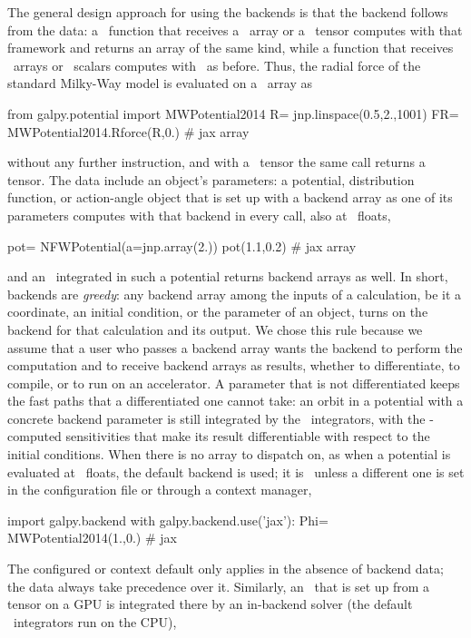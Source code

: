 The general design approach for using the backends is that the backend follows from the data: 
a \galpy\ function that receives a \jax\
array or a \torch\ tensor computes with that framework and returns an
array of the same kind, while a function that receives \numpy\ arrays or
\python\ scalars computes with \numpy\ as before. Thus, the radial force
of the standard Milky-Way model is evaluated on a \jax\ array as
\begin{code}
from galpy.potential import MWPotential2014
R= jnp.linspace(0.5,2.,1001)
FR= MWPotential2014.Rforce(R,0.) # jax array
\end{code}
without any further instruction, and with a \torch\ tensor the same
call returns a tensor. The data include an object's parameters: a
potential, distribution function, or action-angle object that is set up
with a backend array as one of its parameters computes with that backend
in every call, also at \python\ floats,
\begin{code}
pot= NFWPotential(a=jnp.array(2.))
pot(1.1,0.2) # jax array
\end{code}
and an \orb\ integrated in such a potential returns backend arrays as
well. In short, backends are \emph{greedy}: any backend array among
the inputs of a calculation, be it a coordinate, an initial condition,
or the parameter of an object, turns on the backend for that
calculation and its output. We chose this rule because we assume that
a user who passes a backend array wants the backend to perform the
computation and to receive backend arrays as results, whether to
differentiate, to compile, or to run on an accelerator. A parameter that
is not differentiated keeps the fast paths that a differentiated one
cannot take: an orbit in a potential with a concrete backend parameter
is still integrated by the \cc\ integrators, with the \cc-computed
sensitivities that make its result differentiable with respect to the
initial conditions. When there is no array to dispatch on, as when
a potential is evaluated at \python\ floats, the default
backend is used; it is \numpy\ unless a different one is set in the
configuration file or through a context manager,
\begin{code}
import galpy.backend
with galpy.backend.use('jax'):
    Phi= MWPotential2014(1.,0.) # jax
\end{code}
The configured or context default only applies in the absence of
backend data; the data always take precedence over it. Similarly, an
\orb\ that is set up from a tensor on a GPU is integrated there by an
in-backend solver (the default \cc\ integrators run on the CPU),
